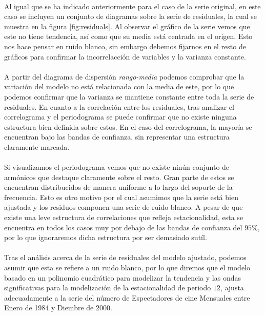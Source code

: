 \documentclass[a4paper, spanish]{article}
\begin{document}
    \paragraph{}
    Al igual que se ha indicado anteriormente para el caso de la serie original, en este caso se incluyen un conjunto de diagramas sobre la serie de residuales, la cual se muestra en la figura \ref{fig:residuals}. Al observar el gráfico de la serie vemos que este no tiene tendencia, así como que su media está centrada en el origen. Esto nos hace pensar en ruido blanco, sin embargo debemos fijarnos en el resto de gráficos para confirmar la incorrelacción de variables y la varianza constante.

    \paragraph{}
    A partir del diagrama de dispersión \emph{rango-media} podemos comprobar que la variación del modelo no está relacionada con la media de este, por lo que podemos confirmar que la varianza se mantiene constante entre toda la serie de residuales. En cuanto a la correlación entre los residuales, tras analizar el correlograma y el periodograma se puede confirmar que no existe ninguna estructura bien definida sobre estos. En el caso del correlograma, la mayoría se encuentran bajo las bandas de confianza, sin representar una estructura claramente marcada.

    \paragraph{}
    Si visualizamos el periodograma vemos que no existe ninún conjunto de armónicos que destaque claramente sobre el resto. Gran parte de estos se encuentran distribucidos de manera uniforme a lo largo del soporte de la frecuencia. Esto es otro motivo por el cual asumimos que la serie está bien ajustada y los residuos componen una serie de ruido blanco. A pesar de que existe una leve estructura de correlaciones que refleja estacionalidad, esta se encuentra en todos los casos muy por debajo de las bandas de confianza del $95\%$, por lo que ignoraremos dicha estructura por ser demasiado sutíl.

    \paragraph{}
    Tras el análisis acerca de la serie de residuales del modelo ajustado, podemos asumir que esta se refiere a un ruido blanco, por lo que diremos que el modelo basado en un polinomio cuadrático para modelizar la tendencia  y las ondas significativas para la modelización de la estacionalidad de periodo $12$, ajusta adecuadamente a la serie del número de Espectadores de cine Mensuales entre Enero de 1984 y Diembre de 2000.
\end{document}
